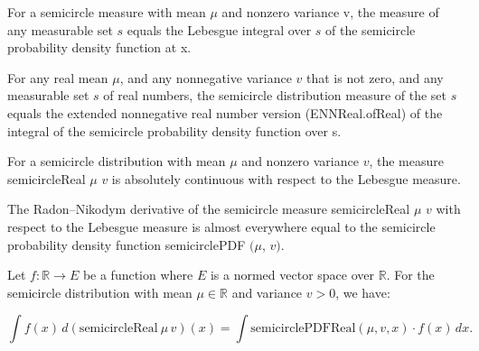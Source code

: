 \begin{lemma}
    \label{lemma:semicircleReal_apply}
    \leanok
    For a semicircle measure with mean $\mu$ and nonzero variance v, the measure of any measurable set $s$ equals the Lebesgue integral over $s$ of the semicircle probability density function at x.
\end{lemma}

\begin{lemma}
    \label{lemma:semicircleReal_apply_eq_integral}
    \leanok
    For any real mean $\mu$, and any nonnegative variance $v$ that is not zero, and any measurable set $s$ of real numbers, the semicircle distribution measure of the set $s$ equals the extended nonnegative real number version (ENNReal.ofReal) of the integral of the semicircle probability density function over s.
\end{lemma}

\begin{lemma}
    \label{lemma:semicircleReal_absolutelyContinuous}
    \leanok
    For a semicircle distribution with mean $\mu$ and nonzero variance $v$, the measure semicircleReal $μ$ $v$ is absolutely continuous with respect to the Lebesgue measure.
\end{lemma}

\begin{lemma}
    \label{lemma:rnDeriv_semicircleReal}
    \leanok
    The Radon–Nikodym derivative of the semicircle measure semicircleReal $\mu$ $v$ with respect to the Lebesgue measure is almost everywhere equal to the semicircle probability density function semicirclePDF $(\mu$, $v)$.
\end{lemma}

\begin{lemma}
    \label{lemma:integral_semicircleReal_eq_integral_smul}
    \leanok

    Let $ f : \mathbb{R} \to E $ be a function where $ E $ is a normed vector space over $\mathbb{R}$. For the semicircle distribution with mean $\mu \in \mathbb{R}$ and variance $ v > 0 $, we have:

    \[
    \int f(x) \, d(\mathrm{semicircleReal}\ \mu\, v)(x) = \int \mathrm{semicirclePDFReal}(\mu, v, x) \cdot f(x) \, dx.
    \]
    
    
\end{lemma}


